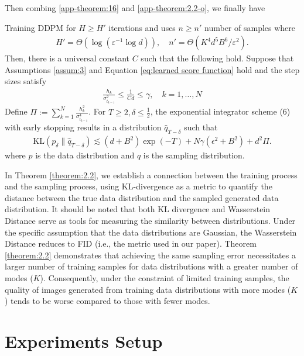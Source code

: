 Then combing \cref{app-theorem:16} and \cref{app-theorem:2.2-o}, we finally have
\begin{theorem}
\label{app-theorem:2.2}
Training DDPM  for $H \geq H'$ iterations and uses $n \geq n'$ number of samples where
\begin{align*}
    H' = \Theta(\log(\varepsilon^{-1} \log d)),\quad  n' = \Theta(K^4d^5B^6/\varepsilon^2).
\end{align*}
Then, there is a universal constant \(C\) such that the following hold. Suppose that Assumptions \ref{assum:3} and Equation \ref{eq:learned score function} hold and the step sizes satisfy
\begin{align}
    \frac{h_k}{\sigma_{t_{k-1}}^2} \leq \frac{1}{Cd} \le \gamma, \quad k = 1, \ldots, N
\end{align}
Define \(\Pi := \sum_{k=1}^N \frac{h_k^2}{\sigma_{t_{k-1}}^4}\). For \(T \geq 2, \delta \leq \frac{1}{2}\), the exponential integrator scheme (6) with early stopping results in a distribution \(\hat{q}_{T-\delta}\) such that
\begin{align}
    \mathrm{KL}(p_\delta \| \hat{q}_{T-\delta}) \lesssim (d + B^2) \exp(-T) + N\gamma (\epsilon^2+B^2) + d^2 \Pi.
\end{align}
where $p$ is the data distribution and $\hat{q}$ is the sampling distribution.
\end{theorem}

In Theorem \ref{theorem:2.2}, we establish a connection between the training process and the sampling process, using KL-divergence as a metric to quantify the distance between the true data distribution and the sampled generated data distribution. It should be noted that both KL divergence and Wasserstein Distance serve as tools for measuring the similarity between distributions. Under the specific assumption that the data distributions are Gaussian, the Wasserstein Distance reduces to FID (i.e., the metric used in our paper). Theorem \ref{theorem:2.2} demonstrates that achieving the same sampling error necessitates a larger number of training samples for data distributions with a greater number of modes ($K$). Consequently, under the constraint of limited training samples, the quality of images generated from training data distributions with more modes ($K$) tends to be worse compared to those with fewer modes.



\section{Experiments Setup}
\label{sec:appendix-exp}

